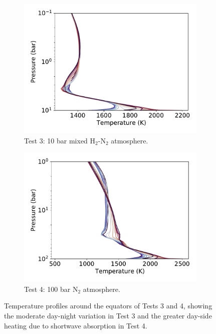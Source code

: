 \begin{figure}
  \centering
  \begin{subfigure}[t]{0.49\textwidth}
    \includegraphics[width=\textwidth]{figures/soc-lava-planets/h2n2-soc-tp.pdf}
    \caption{Test 3: 10 bar mixed H$_{2}$-N$_{2}$ atmosphere.}\label{fig:soc-tp-h2n2}
  \end{subfigure}
  \begin{subfigure}[t]{0.49\textwidth}
    \includegraphics[width=\textwidth]{figures/soc-lava-planets/n2-100bar-soc-tp.pdf}
    \caption{Test 4: 100 bar N$_{2}$ atmosphere.}\label{fig:soc-tp-n2-100bar}
  \end{subfigure}
  \caption{Temperature profiles around the equators of Tests 3 and 4, showing the moderate day-night variation in Test 3 and the greater day-side heating due to shortwave absorption in Test 4.}
  \label{fig:soc-tp-best}
\end{figure}


